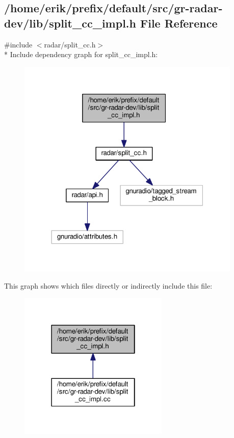 \subsection{/home/erik/prefix/default/src/gr-\/radar-\/dev/lib/split\+\_\+cc\+\_\+impl.h File Reference}
\label{split__cc__impl_8h}
{\ttfamily \#include $<$radar/split\+\_\+cc.\+h$>$}\\*
Include dependency graph for split\+\_\+cc\+\_\+impl.\+h\+:
\nopagebreak
\begin{figure}[H]
\begin{center}
\leavevmode
\includegraphics[width=302pt]{de/d5a/split__cc__impl_8h__incl}
\end{center}
\end{figure}
This graph shows which files directly or indirectly include this file\+:
\nopagebreak
\begin{figure}[H]
\begin{center}
\leavevmode
\includegraphics[width=202pt]{db/d2c/split__cc__impl_8h__dep__incl}
\end{center}
\end{figure}
